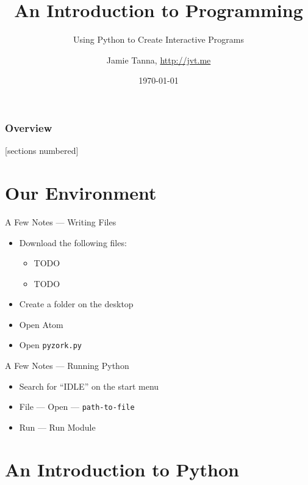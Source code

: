 \documentclass[10pt]{beamer}
\title{An Introduction to Programming}
\subtitle{Using Python to Create Interactive Programs}
\date{\today}
\author{Jamie Tanna, \url{http://jvt.me}}
\institute{\href{http://hacksocnotts.co.uk}{Hacksoc Nottingham}
}
\newcommand*{\red}[1]{{\color{red}#1}}
\begin{document}
\maketitle

\begin{frame}
	\frametitle{Overview}
	[sections numbered]
	\tableofcontents
\end{frame}

\section{Our Environment}

\begin{frame}{A Few Notes --- Writing Files}

	\begin{itemize}
		\item Download the following files:
			\begin{itemize}
				\item \red{TODO}
				\item \red{TODO}
			\end{itemize}

		\item Create a folder on the desktop
		\item Open Atom
		\item Open \texttt{pyzork.py}
	\end{itemize}

\end{frame}

\begin{frame}{A Few Notes --- Running Python}

	\begin{itemize}
		\item Search for ``IDLE'' on the start menu
		\item File --- Open --- \texttt{path-to-file}
		\item Run --- Run Module
	\end{itemize}

\end{frame}

\section{An Introduction to Python}
\end{document}
